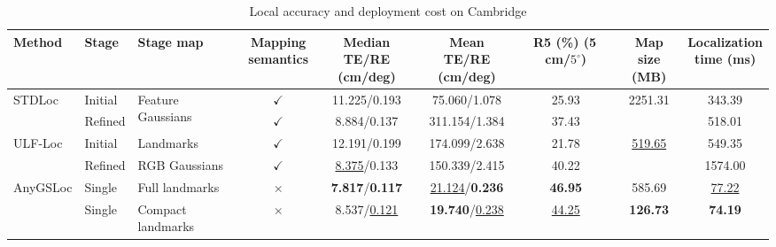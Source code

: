 \begin{table}[!t]
\centering
\footnotesize
\setlength{\tabcolsep}{2pt}
\renewcommand{\arraystretch}{1.15}
\caption{Local accuracy and deployment cost on Cambridge}\label{tab:t4}
\begin{tabular*}{\linewidth}{@{\extracolsep{\fill}}lllcccccc@{}}
\toprule
Method & Stage & Stage map & \shortstack{Mapping\\semantics} & \shortstack{Median TE/RE\\(cm/deg)} & \shortstack{Mean TE/RE\\(cm/deg)} & \shortstack{R5 (\%)\\(5\,cm/$5^\circ$)} & \shortstack{Map size\\(MB)} & \shortstack{Localization\\time (ms)} \\
\midrule
\multirow{2}{*}{STDLoc} & Initial & \multirow{2}{*}{Feature Gaussians} & $\checkmark$ & 11.225/0.193 & 75.060/1.078 & 25.93 & \multirow{2}{*}{2251.31} & 343.39 \\
 & Refined &  & $\checkmark$ & 8.884/0.137 & 311.154/1.384 & 37.43 &  & 518.01 \\
\midrule
\multirow{2}{*}{ULF-Loc} & Initial & Landmarks & $\checkmark$ & 12.191/0.199 & 174.099/2.638 & 21.78 & \multirow{2}{*}{\underline{519.65}} & 549.35 \\
 & Refined & RGB Gaussians & $\checkmark$ & \underline{8.375}/0.133 & 150.339/2.415 & 40.22 &  & 1574.00 \\
\midrule
\multirow{2}{*}{AnyGSLoc} & Single & Full landmarks & $\times$ & \textbf{7.817}/\textbf{0.117} & \underline{21.124}/\textbf{0.236} & \textbf{46.95} & 585.69 & \underline{77.22} \\
 & Single & Compact landmarks & $\times$ & 8.537/\underline{0.121} & \textbf{19.740}/\underline{0.238} & \underline{44.25} & \textbf{126.73} & \textbf{74.19} \\
\bottomrule
\end{tabular*}
\end{table}
